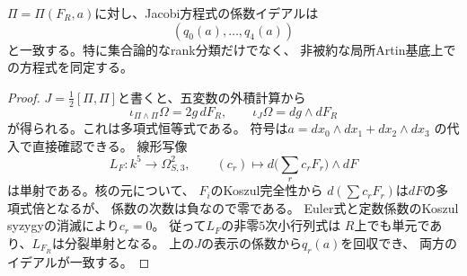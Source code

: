 \begin{proposition}
\label{prop:artin-pfaffian}
$\Pi=\Pi(F_R,a)$に対し、Jacobi方程式の係数イデアルは
\[
 (q_0(a),\ldots,q_4(a))
\]
と一致する。特に集合論的なrank分類だけでなく、
非被約な局所Artin基底上での方程式を同定する。
\end{proposition}
\begin{proof}
$J=\frac12[\Pi,\Pi]$と書くと、五変数の外積計算から
\[
 \iota_{\Pi\wedge\Pi}\Omega=2g\,dF_R,\qquad
 \iota_J\Omega=dg\wedge dF_R
\]
が得られる。これは多項式恒等式である。
符号は$ a=dx_0\wedge dx_1+dx_2\wedge dx_3$
の代入で直接確認できる。
線形写像
\[
 L_F:k^5\longrightarrow\Omega^2_{S,3},\qquad
 (c_r)\longmapsto d\bigl(\textstyle\sum_rc_rF_r\bigr)\wedge dF
\]
は単射である。核の元について、
$F_i$のKoszul完全性から
$d(\sum c_rF_r)$は$dF$の多項式倍となるが、
係数の次数は負なので零である。
Euler式と定数係数のKoszul syzygyの消滅により$c_r=0$。
従って$L_F$の非零$5$次小行列式は
$R$上でも単元であり、$L_{F_R}$は分裂単射となる。
上の$J$の表示の係数から$q_r(a)$を回収でき、
両方のイデアルが一致する。
\end{proof}

